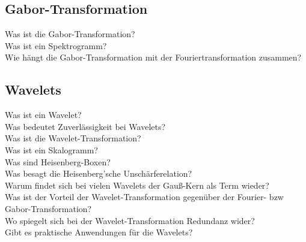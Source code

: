 \subsection{Gabor-Transformation}
\begin{description}
  \item[Was ist die Gabor-Transformation?]
  \item[Was ist ein Spektrogramm?]
  \item[Wie hängt die Gabor-Transformation mit der Fouriertransformation zusammen?]
\end{description}
\subsection{Wavelets}
\begin{description}
  \item[Was ist ein Wavelet?]
  \item[Was bedeutet Zuverlässigkeit bei Wavelets?]
  \item[Was ist die Wavelet-Transformation?]
  \item[Was ist ein Skalogramm?]
  \item[Was sind Heisenberg-Boxen?]
  \item[Was besagt die Heisenberg'sche Unschärferelation?]
  \item[Warum findet sich bei vielen Wavelets der Gauß-Kern als Term wieder?]
  \item[Was ist der Vorteil der Wavelet-Transformation gegenüber der Fourier- bzw Gabor-Transformation?]
  \item[Wo spiegelt sich bei der Wavelet-Transformation Redundanz wider?]
  \item[Gibt es praktische Anwendungen für die Wavelets?]
\end{description}



